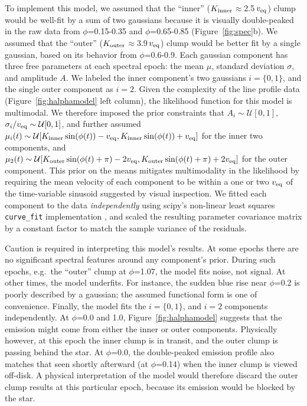 \documentclass[11pt,twocolumn,tighten]{aastex7}
\begin{document}
To implement this model, we assumed that the ``inner'' ($K_{\rm
inner}$$\approx$2.5\,$v_{\rm eq}$) clump would be well-fit by a sum of
two gaussians because it is visually double-peaked in the raw data
from $\phi$=0.15-0.35 and $\phi$=0.65-0.85 (Figure~\ref{fig:spec}b).
We assumed that the ``outer'' ($K_{\rm outer}$$\approx$3.9\,$v_{\rm
eq}$) clump would be better fit by a single gaussian, based on its
behavior from $\phi$=0.6-0.9.  Each gaussian component has three free
parameters at each spectral epoch: the mean $\mu$, standard deviation
$\sigma$, and amplitude $A$.  We labeled the inner component's two
gaussians $i=\{ 0, 1 \}$, and the single outer component as $i=2$.
Given the complexity of the line profile data
(Figure~\ref{fig:halphamodel} left column), the likelihood function
for this model is multimodal.  We therefore imposed the prior
constraints that $A_i \sim \mathcal{U}[0,1]$,
$\sigma_i/v_{\rm eq} \sim \mathcal{U}[0,1]$, and further assumed
$\mu_i(t) \sim
\mathcal{U}[
  K_{\rm inner}\sin(\phi(t)) - v_{\rm eq},
  K_{\rm inner}\sin(\phi(t)) + v_{\rm eq}
]$
for the inner two components, and
$\mu_2(t) \sim
\mathcal{U}[
  K_{\rm outer}\sin(\phi(t) + \pi) - 2v_{\rm eq},
  K_{\rm outer}\sin(\phi(t) + \pi) + 2v_{\rm eq}
]$
for the outer component.  This prior on the means mitigates
multimodality in the likelihood by requiring the mean velocity of each
component to be within a one or two $v_{\rm eq}$ of the time-variable
sinusoid suggested by visual inspection.  We fitted each component to
the data {\it independently} using scipy's non-linear least squares
\texttt{curve\_fit} implementation \citep{Virtanen2020}, and scaled the
resulting parameter covariance matrix by a constant factor to match
the sample variance of the residuals.

Caution is required in interpreting this model's results.  At some
epochs there are no significant spectral features around any component's
prior.  During such epochs, e.g.~the
``outer'' clump at $\phi$=1.07, the model fits noise, not signal.  At
other times, the model underfits.  For instance, the sudden blue rise
near $\phi$=0.2 is poorly described by a gaussian; the assumed
functional form is one of convenience.  Finally, the model fits the
$i=\{ 0, 1 \}$, and $i=2$ components independently.  At $\phi$=0.0 and
1.0, Figure~\ref{fig:halphamodel} suggests that the emission might
come from either the inner or outer components.  Physically however,
at this epoch the inner clump is in transit, and the outer clump is
passing behind the star.  At $\phi$=0.0, the double-peaked emission
profile also matches that seen shortly afterward (at $\phi$=0.14) when
the inner clump is viewed off-disk.  A physical interpretation of the
model would therefore discard the outer clump results at this
particular epoch, because its emission would be blocked by the star.
\end{document}
